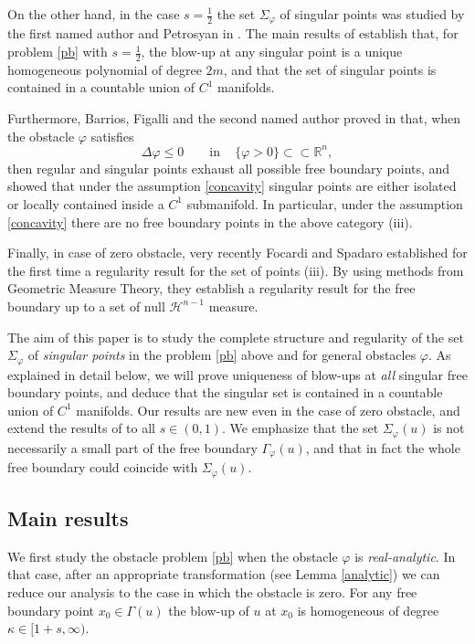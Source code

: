 \documentclass[11pt]{amsart}
\theoremstyle{plain}
\numberwithin{equation}{section}
\begin{document}
On the other hand, in the case $s=\frac12$ the set $\Sigma_\varphi$ of {singular points} was studied  by the first named author and Petrosyan in \cite{GP}.
The main results of \cite{GP} establish that, for problem \eqref{pb} with $s=\frac12$, the blow-up at any singular point is a unique homogeneous polynomial of degree $2m$, and that the set of singular points is contained in a countable union of $C^1$ manifolds.

Furthermore, Barrios, Figalli and the second named author proved in \cite{BFR} that, when the obstacle $\varphi$ satisfies
\begin{equation}\label{concavity}
\Delta \varphi\leq0\qquad \textrm{in}\quad\, \{\varphi>0\}\subset\subset{\mathbb R}^n,
\end{equation}
then regular and singular points exhaust all possible free boundary points, and showed that under the assumption \eqref{concavity} singular points are either isolated or locally contained inside a $C^1$ submanifold. 
In particular, under the assumption \eqref{concavity} there are no free boundary points in the above category (iii).

Finally, in case of {zero obstacle}, very recently Focardi and Spadaro \cite{FSpadaro} established for the first time a regularity result for the set of points (iii).
By using methods from Geometric Measure Theory, they establish a regularity result for the free boundary up to a set of null $\mathcal H^{n-1}$ measure.

The aim of this paper is to study the complete structure and regularity of the set $\Sigma_\varphi$ of \emph{singular points} in the problem \eqref{pb} above and for general obstacles $\varphi$. 
As explained in detail below, we will prove uniqueness of blow-ups at \emph{all} singular free boundary points, and deduce that the singular set is contained in a countable union of $C^1$ manifolds.
Our results are new even in the case of zero obstacle, and extend the results of \cite{GP} to all $s\in(0,1)$.
We emphasize that the set $\Sigma_\varphi(u)$ is not necessarily a small part of the free boundary $\Gamma_\varphi(u)$, and that in fact the whole free boundary could coincide with $\Sigma_\varphi(u)$.

\subsection{Main results}

We first study the obstacle problem \eqref{pb} when the obstacle $\varphi$ is \emph{real-analytic}.
In that case, after an appropriate transformation (see Lemma \ref{analytic}) we can reduce our analysis to the case in which the obstacle is zero. For any free boundary point $x_0\in \Gamma(u)$ the blow-up of $u$ at $x_0$ is homogeneous of degree $\kappa\in[1+s,\infty)$.
\end{document}
